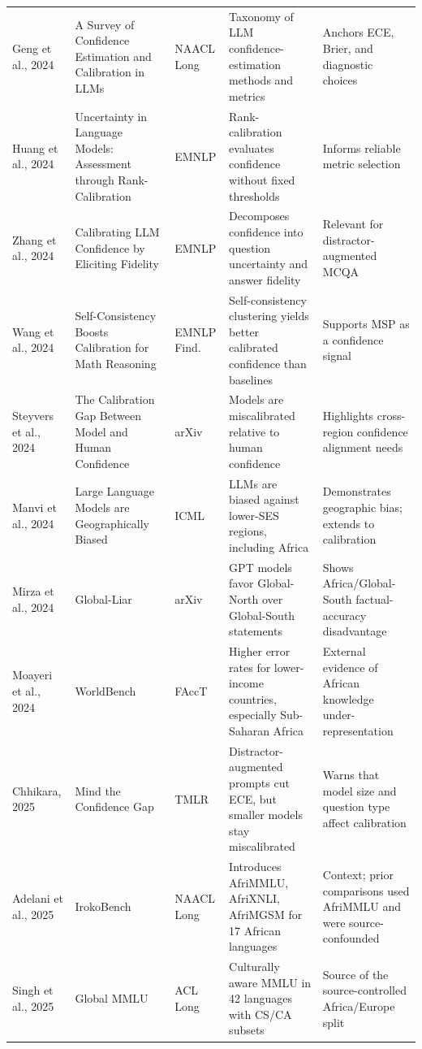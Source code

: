 \documentclass[11pt]{article}
\begin{document}
\begin{table}[t]
\begin{tabular}{@{}p{2.0cm}p{3.9cm}p{1.4cm}p{4.0cm}p{3.6cm}@{}}
Geng et al., 2024 \cite{geng2024survey} & A Survey of Confidence Estimation and Calibration in LLMs & NAACL Long & Taxonomy of LLM confidence-estimation methods and metrics & Anchors ECE, Brier, and diagnostic choices \\
Huang et al., 2024 \cite{huang2024rank} & Uncertainty in Language Models: Assessment through Rank-Calibration & EMNLP & Rank-calibration evaluates confidence without fixed thresholds & Informs reliable metric selection \\
Zhang et al., 2024 \cite{zhang2024calibrating} & Calibrating LLM Confidence by Eliciting Fidelity & EMNLP & Decomposes confidence into question uncertainty and answer fidelity & Relevant for distractor-augmented MCQA \\
Wang et al., 2024 \cite{wang2024self} & Self-Consistency Boosts Calibration for Math Reasoning & EMNLP Find. & Self-consistency clustering yields better calibrated confidence than baselines & Supports MSP as a confidence signal \\
Steyvers et al., 2024 \cite{steyvers2024calibration} & The Calibration Gap Between Model and Human Confidence & arXiv & Models are miscalibrated relative to human confidence & Highlights cross-region confidence alignment needs \\
Manvi et al., 2024 \cite{manvi2024geographically} & Large Language Models are Geographically Biased & ICML & LLMs are biased against lower-SES regions, including Africa & Demonstrates geographic bias; extends to calibration \\
Mirza et al., 2024 \cite{mirza2024global} & Global-Liar & arXiv & GPT models favor Global-North over Global-South statements & Shows Africa/Global-South factual-accuracy disadvantage \\
Moayeri et al., 2024 \cite{moayeri2024worldbench} & WorldBench & FAccT & Higher error rates for lower-income countries, especially Sub-Saharan Africa & External evidence of African knowledge under-representation \\
Chhikara, 2025 \cite{chhikara2025mind} & Mind the Confidence Gap & TMLR & Distractor-augmented prompts cut ECE, but smaller models stay miscalibrated & Warns that model size and question type affect calibration \\
Adelani et al., 2025 \cite{adelani2025irokobench} & IrokoBench & NAACL Long & Introduces AfriMMLU, AfriXNLI, AfriMGSM for 17 African languages & Context; prior comparisons used AfriMMLU and were source-confounded \\
Singh et al., 2025 \cite{singh2025global} & Global MMLU & ACL Long & Culturally aware MMLU in 42 languages with CS/CA subsets & Source of the source-controlled Africa/Europe split \\

\end{tabular}
\end{table}
\end{document}
